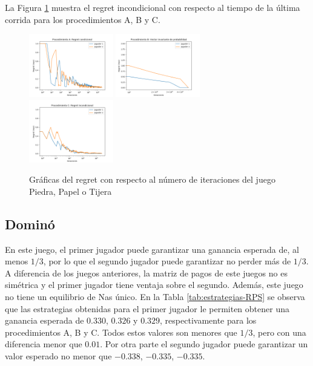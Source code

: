 La Figura \ref{fig:regret-RPS} muestra el regret incondicional con respecto al tiempo de la última corrida para los procedimientos A, B y C.

\begin{figure}[ht]
\caption{Gráficas del regret con respecto al número de iteraciones del juego Piedra, Papel o Tijera}
\label{fig:regret-RPS}
\centering
\includegraphics[width=0.327\textwidth]{graficas/RPS/procedimiento-A.png}
\includegraphics[width=0.327\textwidth]{graficas/RPS/procedimiento-B.png}
\includegraphics[width=0.327\textwidth]{graficas/RPS/procedimiento-C.png}
\end{figure}

\subsection{Dominó}

En este juego, el primer jugador puede garantizar una ganancia esperada de, al menos $1/3$, por lo que el segundo jugador puede garantizar no perder más de $1/3$. A diferencia de los juegos anteriores, la matriz de pagos de este juegos no es simétrica y el primer jugador tiene ventaja sobre el segundo. Además, este juego no tiene un equilibrio de Nas único. En la Tabla \ref{tab:estrategias-RPS} se observa que las estrategias obtenidas para el primer jugador le permiten obtener una ganancia esperada de $0.330$, $0.326$ y $0.329$, respectivamente para los procedimientos A, B y C. Todos estos valores son menores que $1/3$, pero con una diferencia menor que $0.01$. Por otra parte el segundo jugador puede garantizar un valor esperado no menor que $-0.338$, $-0.335$, $-0.335$.

